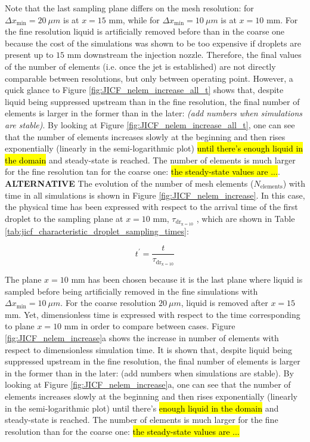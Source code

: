 Note that the last sampling plane differs on the mesh resolution: for $\Delta x_\mathrm{min} = 20~\mu m$ is at $x = 15$ mm, while for $\Delta x_\mathrm{min} = 10~\mu m$ is at $x = 10$ mm. For the fine resolution liquid is artificially removed before than in the coarse one because the cost of the simulations was shown to be too expensive if droplets are present up to $15$ mm downstream the injection nozzle. Therefore, the final values of the number of elements (i.e. once the jet is established) are not directly comparable between resolutions, but only between operating point. However, a quick glance to Figure \ref{fig:JICF_nelem_increase_all_t} shows that, despite liquid being suppressed upstream than in the fine resolution, the final number of elements is larger in the former than in the later: \textsl{(add numbers when simulations are stable)}. By looking at Figure \ref{fig:JICF_nelem_increase_all_t}, one can see that the number of elements increases slowly at the beginning and then rises exponentially (linearly in the semi-logarithmic plot) \hl{until there's enough liquid in the domain} and steady-state is reached. The number of elements is much larger for the fine resolution tan for the coarse one: \hl{the steady-state values are ...}. \\

\textbf{ALTERNATIVE} The evolution of the number of mesh elements ($N_\mathrm{elements}$) with time in all simulations is shown in Figure \ref{fig:JICF_nelem_increase}. In this case, the physical time has been expressed with respect to the arrival time of the first droplet to the sampling plane at $x = 10$ mm, $\tau_\mathrm{dr_{x=10}}$ , which are shown in Table \ref{tab:jicf_characteristic_droplet_sampling_times}:



\begin{equation}
t^{\prime} = \frac{t}{\tau_\mathrm{dr_{x=10}}}
\end{equation}

The plane $x = 10$ mm has been chosen because it is the last plane where liquid is sampled before being artificially removed in the fine simulations with $\Delta x_\mathrm{min} = 10 ~\mu m$. For the coarse resolution $20 ~\mu m$, liquid is removed after $x = 15$ mm. Yet, dimensionless time is expressed with respect to the time corresponding to plane $x = 10$ mm in order to compare between cases. Figure \ref{fig:JICF_nelem_increase}a shows the increase in number of elements with respect to dimensionless simulation time. It is shown that, despite liquid being suppressed upstream in the fine resolution, the final number of elements is larger in the former than in the later: (add numbers when simulations are stable). By looking at Figure \ref{fig:JICF_nelem_increase}a, one can see that the number of elements increases slowly at the beginning and then rises exponentially (linearly in the semi-logarithmic plot) until there’s \hl{enough liquid in the domain} and steady-state is reached. The number of elements is much larger for the fine resolution than for the coarse one: \hl{the steady-state values are ... }

